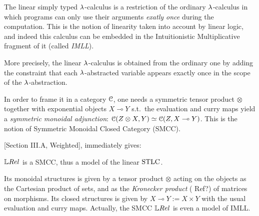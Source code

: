 The linear simply typed $\lambda$-calculus is a restriction of the ordinary $\lambda$-calculus in which programs can only use their arguments \emph{exatly once} during the computation.
This is the notion of linearity taken into account by linear logic, and indeed this calculus can be embedded in the Intuitionistic Multiplicative fragment of it (called \emph{IMLL}).

More precisely, the linear $\lambda$-calculus is obtained from the ordinary one by adding the constraint that each $\lambda$-abstracted variable appears exactly once in the scope of the $\lambda$-abstraction.

In order to frame it in a category $\mathcal{C}$, one needs a symmetric tensor product $\otimes$ together with exponential objects $X\multimap Y$ s.t.\ the evaluation and curry maps yield a \emph{symmetric monoidal adjunction}: $\mathcal{C}(Z\otimes X, Y) \simeq \mathcal{C} (Z, X\multimap Y)$.
This is the notion of Symmetric Monoidal Closed Category (SMCC).

[Section III.A, Weighted], immediately gives:

\begin{fact}\label{fact:LREL_SMCC}
 $\LREL$ is a SMCC, thus a model of the linear $\mathrm{STLC}$.
\end{fact}

Its monoidal structures is given by a tensor product $\otimes$ acting on the objects as the Cartesian product of sets, and as the \emph{Kronecker product} {(\color{red} Ref?)} of matrices on morphisms.
Its closed structures is given by $X\multimap Y:=X\times Y$ with the usual evaluation and curry maps.
Actually, the SMCC $\LREL$ is even a model of IMLL.
